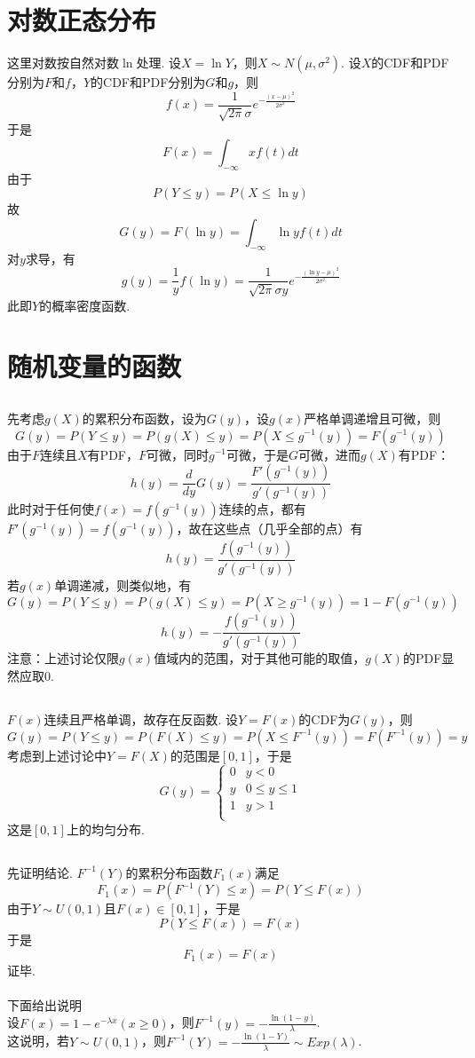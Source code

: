 \documentclass{article}
\begin{document}
\begin{CJK}{UTF8}{gbsn}
\section{对数正态分布}
这里对数按自然对数$\ln$处理. 设$X=\ln Y$，则$X\sim N(\mu,\sigma^{2})$. 设$X$的CDF和PDF分别为$F$和$f$，$Y$的CDF和PDF分别为$G$和$g$，则
$$ f(x)=\frac{1}{\sqrt{2\pi}\sigma}e^{-\frac{(x-\mu)^{2}}{2\sigma^2}}$$
于是
$$ F(x)=\int_{-\infty}{x}f(t)dt $$
由于
$$ P(Y\leq y)=P(X\leq \ln y)$$
故
$$ G(y)=F(\ln y)=\int_{-\infty}{\ln y}f(t)dt $$
对$y$求导，有
$$ g(y)=\frac{1}{y}f(\ln y)=\frac{1}{\sqrt{2\pi}\sigma y}e^{-\frac{(\ln y-\mu)^{2}}{2\sigma^{2}}}$$
此即$Y$的概率密度函数.
\section{随机变量的函数}
\subsection{}
先考虑$g(X)$的累积分布函数，设为$G(y)$，设$g(x)$严格单调递增且可微，则
$$ G(y)=P(Y\leq y)=P(g(X)\leq y)=P(X\leq g^{-1}(y))=F(g^{-1}(y))$$
由于$F$连续且$X$有PDF，$F$可微，同时$g^{-1}$可微，于是$G$可微，进而$g(X)$有PDF：
$$h(y)=\frac{d}{dy}G(y)=\frac{F'(g^{-1}(y))}{g'(g^{-1}(y))}$$
此时对于任何使$f(x)=f(g^{-1}(y))$连续的点，都有$F'(g^{-1}(y))=f(g^{-1}(y))$，故在这些点（几乎全部的点）有
$$h(y)=\frac{f(g^{-1}(y))}{g'(g^{-1}(y))}$$
若$g(x)$单调递减，则类似地，有
$$ G(y)=P(Y\leq y)=P(g(X)\leq y)=P(X\geq g^{-1}(y))=1-F(g^{-1}(y))$$
$$h(y)=-\frac{f(g^{-1}(y))}{g'(g^{-1}(y))}$$
注意：上述讨论仅限$g(x)$值域内的范围，对于其他可能的取值，$g(X)$的PDF显然应取0.
\subsection{}
$F(x)$连续且严格单调，故存在反函数. 设$Y=F(x)$的CDF为$G(y)$，则
$$ G(y)=P(Y\leq y)=P(F(X)\leq y)=P(X\leq F^{-1}(y))=F(F^{-1}(y))=y$$
考虑到上述讨论中$Y=F(X)$的范围是$[0,1]$，于是
\begin{equation}
    G(y)=\left\{
    \begin{array}{cl}
    0 & y<0\\
    y & 0\leq y\leq 1\\
    1 & y>1\\
    \end{array}\right.
\end{equation}
这是$[0,1]$上的均匀分布.
\subsection{}
先证明结论.
$F^{-1}(Y)$的累积分布函数$F_{1}(x)$满足
$$ F_{1}(x)=P(F^{-1}(Y)\leq x)=P(Y\leq F(x)) $$
由于$Y\sim U(0,1)$且$F(x)\in [0,1]$，于是
$$P(Y\leq F(x))=F(x)$$
于是
$$ F_{1}(x)=F(x)$$
证毕.
\\\\下面给出说明
\\设$F(x)=1-e^{-\lambda x}(x\geq 0)$，则$F^{-1}(y)=-\frac{\ln(1-y)}{\lambda}$.
\\这说明，若$Y\sim U(0,1)$，则$F^{-1}(Y)=-\frac{\ln(1-Y)}{\lambda}\sim Exp(\lambda)$.

\end{CJK}
\end{document}
